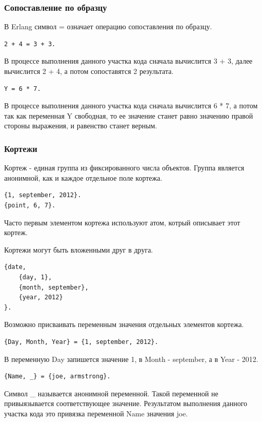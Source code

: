 		\subsubsection{Сопоставление по образцу}
			В Erlang символ = означает операцию сопоставления по
			образцу.
			\begin{lstlisting}
2 + 4 = 3 + 3.
			\end{lstlisting}
			В процессе выполнения данного участка кода сначала вычислится 
			3 + 3, далее вычислится 2 + 4, а потом сопоставятся 2 результата.
			\begin{lstlisting}
Y = 6 * 7.
			\end{lstlisting}
			В процессе выполнения данного участка кода сначала вычислится
			6 * 7, а потом так как переменная Y свободная, то ее значение станет 
			равно значению правой стороны выражения, и равенство станет верным.
			

		\subsubsection{Кортежи}
			Кортеж - единая группа из фиксированного числа объектов. Группа является 
			анонимной, как и каждое отдельное поле кортежа.
			\begin{lstlisting}
{1, september, 2012}.
{point, 6, 7}.
			\end{lstlisting}
			Часто первым элементом кортежа используют атом, котрый описывает этот кортеж.
		
			Кортежи могут быть вложенными друг в друга.
			\begin{lstlisting}
{date,
    {day, 1},
    {month, september},
    {year, 2012}
}.
			\end{lstlisting}

			Возможно присваивать переменным значения отдельных элементов кортежа.
			\begin{lstlisting}
{Day, Month, Year} = {1, september, 2012}.
			\end{lstlisting}
			В переменную Day запишется значение 1, в Month - september, а в Year - 2012.
			
			\begin{lstlisting}
{Name, _} = {joe, armstrong}.
			\end{lstlisting}
			Символ \_ называется анонимной переменной. Такой переменной не привыязывается 
			соответствующее значение. Результатом выполнения данного участка кода это привязка
			переменной Name значения joe.


